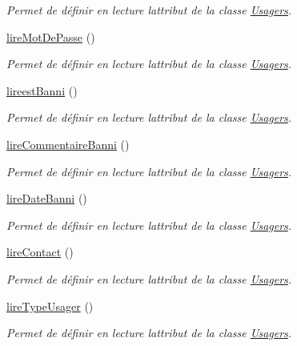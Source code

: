 \begin{DoxyCompactItemize}
\begin{DoxyCompactList}\small\item\em Permet de définir en lecture l\textquotesingle{}attribut de la classe \hyperlink{class_usagers}{Usagers}. \end{DoxyCompactList}\item 
\hyperlink{class_usagers_a01e18fe392c47c4acadb0afd23469b73}{lire\+Mot\+De\+Passe} ()
\begin{DoxyCompactList}\small\item\em Permet de définir en lecture l\textquotesingle{}attribut de la classe \hyperlink{class_usagers}{Usagers}. \end{DoxyCompactList}\item 
\hyperlink{class_usagers_a74e8715928e1e46651eb7fe64754c29e}{lireest\+Banni} ()
\begin{DoxyCompactList}\small\item\em Permet de définir en lecture l\textquotesingle{}attribut de la classe \hyperlink{class_usagers}{Usagers}. \end{DoxyCompactList}\item 
\hyperlink{class_usagers_a6e1d316a863916d5d185f1df24bad1ec}{lire\+Commentaire\+Banni} ()
\begin{DoxyCompactList}\small\item\em Permet de définir en lecture l\textquotesingle{}attribut de la classe \hyperlink{class_usagers}{Usagers}. \end{DoxyCompactList}\item 
\hyperlink{class_usagers_a20a2c86f2e3ff23e342769f1046058df}{lire\+Date\+Banni} ()
\begin{DoxyCompactList}\small\item\em Permet de définir en lecture l\textquotesingle{}attribut de la classe \hyperlink{class_usagers}{Usagers}. \end{DoxyCompactList}\item 
\hyperlink{class_usagers_a51e81c34f159c53639be221e034cad44}{lire\+Contact} ()
\begin{DoxyCompactList}\small\item\em Permet de définir en lecture l\textquotesingle{}attribut de la classe \hyperlink{class_usagers}{Usagers}. \end{DoxyCompactList}\item 
\hyperlink{class_usagers_a7365fedd045258ade6320c9e04c0773d}{lire\+Type\+Usager} ()
\begin{DoxyCompactList}\small\item\em Permet de définir en lecture l\textquotesingle{}attribut de la classe \hyperlink{class_usagers}{Usagers}. \end{DoxyCompactList}\item 

\end{DoxyCompactItemize}
